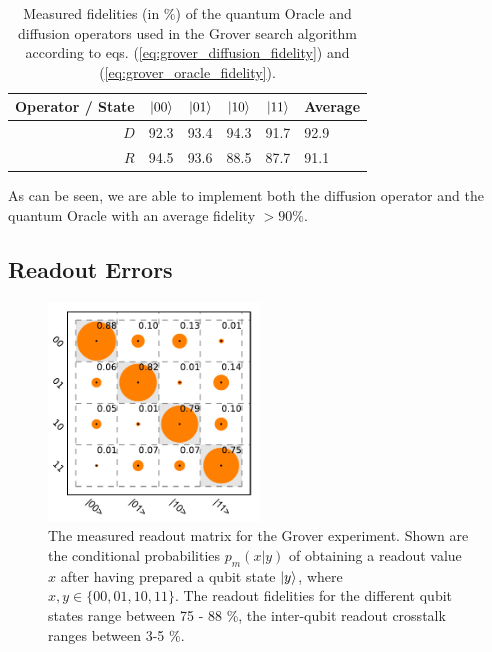 \begin{table}[ht!]
\centering
\begin{tabular}{r|rrrr|l}
Operator / State & $\left| 00 \right>$ & $\left| 01 \right>$ & $\left| 10 \right>$ & $\left| 11 \right>$ & Average \\ \hline 
$D$ & 92.3 & 93.4 & 94.3 & 91.7 & 92.9 \\
$R$ & 94.5 & 93.6 & 88.5 & 87.7 & 91.1
\end{tabular}
\caption{Measured fidelities (in \%) of the quantum Oracle and diffusion operators used in the Grover search algorithm according to eqs. (\ref{eq:grover_diffusion_fidelity}) and (\ref{eq:grover_oracle_fidelity}).}
\end{table}

As can be seen, we are able to implement both the diffusion operator and the quantum Oracle with an average fidelity $>90\%$.

\subsection{Readout Errors}

\begin{figure}
	\centering
\includegraphics[width=0.5\textwidth]{"./data/ct5/2011_04_21 - grover and tomo/good_data/readout only"}
	\caption{The measured readout matrix for the Grover experiment. Shown are the conditional probabilities $p_m(x|y)$ of obtaining a readout value $x$ after having prepared a qubit state $\left| y \right>$, where $x,y\in\{00,01,10,11\}$. The readout fidelities for the different qubit states range between 75 - 88 \%, the inter-qubit readout crosstalk ranges between 3-5 \%.}
	\label{fig:GroverReadoutMatrix}
\end{figure}

